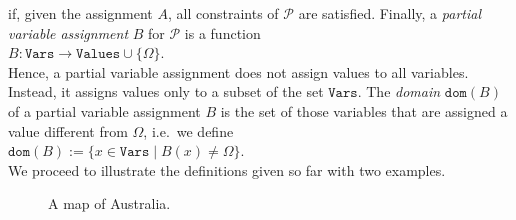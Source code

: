 if, given the assignment $A$, all constraints of $\mathcal{P}$ are satisfied.
Finally, a \emph{partial variable assignment} $B$ for $\mathcal{P}$ is a function
\\[0.2cm]
\hspace*{1.3cm}
$B: \mathtt{Vars} \rightarrow \mathtt{Values} \cup \{ \Omega \}$.
\\[0.2cm]
Hence, a partial variable assignment does not assign values to all variables.  Instead, it assigns values only
to a subset of the set $\mathtt{Vars}$.  The \emph{\color{blue}domain} $\mathtt{dom}(B)$ of a partial variable assignment $B$ is the
set of those variables that are assigned a value different from $\Omega$, i.e.~we define
\\[0.2cm]
\hspace*{1.3cm}
$\mathtt{dom}(B) := \bigl\{ x \in \mathtt{Vars} \mid B(x) \not= \Omega \bigr\}$.
\\[0.2cm]
We proceed to illustrate the definitions given so far with two examples.


\begin{figure}[!ht]
  \centering
  \caption{A map of Australia.}
  \label{fig:australia.pdf}
\end{figure}

